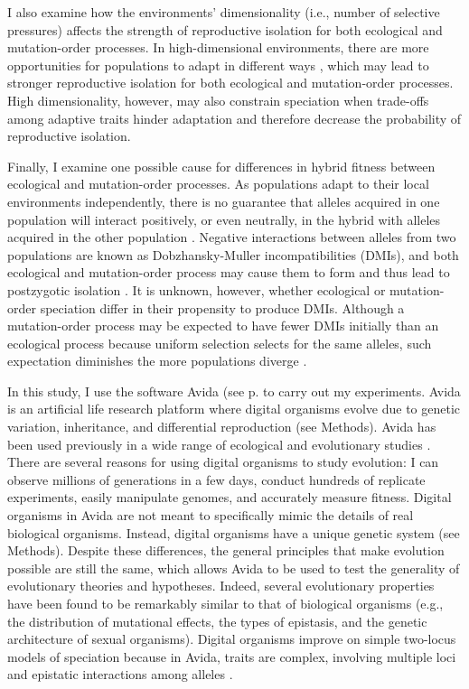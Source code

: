 \begin{doublespace}
I also examine how the environments' dimensionality
(i.e., number of selective pressures)
affects the strength of reproductive isolation
for both ecological and mutation-order processes.
%
In high-dimensional environments,
there are more opportunities for populations
to adapt in different ways \citep{ric93,nos09},
which may lead to stronger reproductive isolation
for both ecological and mutation-order processes.
%
High dimensionality, however, may also constrain speciation
when trade-offs among adaptive traits hinder adaptation
and therefore decrease the probability of reproductive isolation.



Finally, I examine one possible cause for differences
in hybrid fitness between ecological and mutation-order processes.
%
As populations adapt to their local environments independently,
there is no guarantee that alleles acquired in one population
will interact positively, or even neutrally, in the hybrid
with alleles acquired in the other population \citep{coy04}.
%
Negative interactions between alleles from two populations
are known as Dob\-zhan\-sky-Mul\-ler incompatibilities (DMIs),
and both ecological and mutation-order process
may cause them to form and thus lead to postzygotic isolation \citep{sch09}.
%
It is unknown, however, whether ecological or mutation-order speciation
differ in their propensity to produce DMIs.
%
Although a mutation-order process may be expected to have
fewer DMIs initially than an ecological process
because uniform selection selects for the same alleles,
such expectation diminishes the more populations diverge \citep{sch09}.



In this study, I use the software Avida (see p. \pageref{sec:avida}
to carry out my experiments.
%
Avida \citep{ofr04} is an artificial life research platform
where digital organisms evolve due to genetic variation, inheritance,
and differential reproduction (see Methods).
%
Avida has been used previously
in a wide range of ecological and evolutionary studies
\citep[e.g.,][]{len03,cho04,ele07,ost07,mis10}.
%
There are several reasons for using digital organisms to study evolution:
I can observe millions of generations in a few days,
conduct hundreds of replicate experiments,
easily manipulate genomes,
and accurately measure fitness.
%
Digital organisms in Avida are not meant to specifically mimic
the details of real biological organisms.
%
Instead, digital organisms have a unique genetic system (see Methods).
%
Despite these differences, the general principles
that make evolution possible are still the same,
which allows Avida to be used to test the generality
of evolutionary theories and hypotheses.
%
Indeed, several evolutionary properties
have been found to be remarkably similar to that of biological organisms
\citep{wil02,ada06}
(e.g., the distribution of mutational effects, the types of epistasis,
and the genetic architecture of sexual organisms).
%
Digital organisms improve on simple two-locus models of speciation
because in Avida, traits are complex,
involving multiple loci and epistatic interactions among alleles \citep{len99}.




\end{doublespace}
